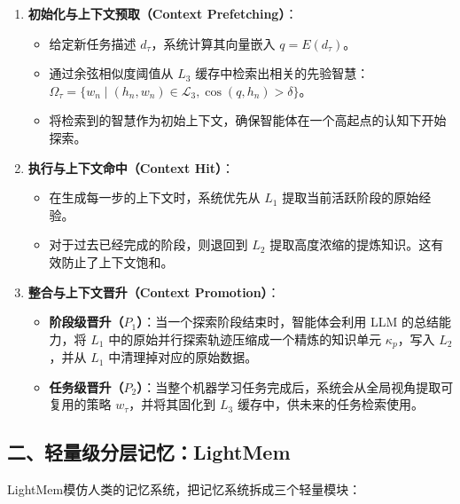 \begin{enumerate}
\def\labelenumi{\arabic{enumi}.}
\tightlist
\item
  \textbf{初始化与上下文预取（Context Prefetching）}：

  \begin{itemize}
  \tightlist
  \item
    给定新任务描述 \(d_{\tau}\)，系统计算其向量嵌入 \(q=E(d_{\tau})\)。
  \item
    通过余弦相似度阈值从 \(L_3\) 缓存中检索出相关的先验智慧：\(\Omega_{\tau}=\{w_n\mid(h_n,w_n)\in\mathcal{L}_3,\cos(q,h_n)>\delta\}\)。
  \item
    将检索到的智慧作为初始上下文，确保智能体在一个高起点的认知下开始探索。
  \end{itemize}
\item
  \textbf{执行与上下文命中（Context Hit）}：

  \begin{itemize}
  \tightlist
  \item
    在生成每一步的上下文时，系统优先从 \(L_1\) 提取当前活跃阶段的原始经验。
  \item
    对于过去已经完成的阶段，则退回到 \(L_2\) 提取高度浓缩的提炼知识。这有效防止了上下文饱和。
  \end{itemize}
\item
  \textbf{整合与上下文晋升（Context Promotion）}：

  \begin{itemize}
  \tightlist
  \item
    \textbf{阶段级晋升（\(P_1\)）}：当一个探索阶段结束时，智能体会利用 LLM 的总结能力，将 \(L_1\) 中的原始并行探索轨迹压缩成一个精炼的知识单元 \(\kappa_p\)，写入 \(L_2\)，并从 \(L_1\) 中清理掉对应的原始数据。
  \item
    \textbf{任务级晋升（\(P_2\)）}：当整个机器学习任务完成后，系统会从全局视角提取可复用的策略 \(w_{\tau}\)，并将其固化到 \(L_3\) 缓存中，供未来的任务检索使用。
  \end{itemize}
\end{enumerate}

\hypertarget{ux4e8cux8f7bux91cfux7ea7ux5206ux5c42ux8bb0ux5fc6lightmem}{%
\subsection{二、轻量级分层记忆：LightMem}\label{ux4e8cux8f7bux91cfux7ea7ux5206ux5c42ux8bb0ux5fc6lightmem}}

LightMem模仿人类的记忆系统，把记忆系统拆成三个轻量模块：

